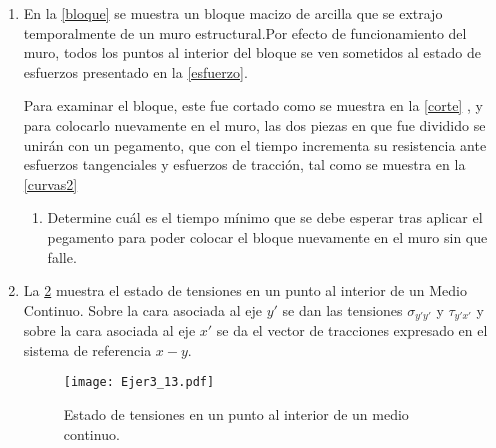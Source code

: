 \documentclass[../notas medios.tex]{subfiles}
\begin{document}
\begin{enumerate}
\item \label{punto12} En la \cref{bloque} se muestra un bloque macizo de
arcilla que se extrajo temporalmente de un muro estructural.Por efecto de funcionamiento del muro, todos los puntos al interior del bloque se ven sometidos al estado de esfuerzos presentado en la \cref{esfuerzo}.
%
\begin{figure}[H]
	\centering
		\hspace{0.5cm}
	\caption{ }
	\label{TensSupPrin}
\end{figure}
%
Para examinar el bloque, este fue cortado como se muestra en la \cref{corte} , y para colocarlo nuevamente en el muro, las dos piezas en que fue dividido se unirán con un pegamento, que con el tiempo incrementa su resistencia ante esfuerzos tangenciales y esfuerzos de tracción, tal como se muestra en la \cref{curvas2} 
%
\begin{figure}[H]
	\centering
		\hspace{1.0cm}
	\caption{ }
\end{figure}
%
\begin{enumerate}
	\item Determine cuál es el  tiempo mínimo que se debe esperar tras aplicar el pegamento para poder colocar el bloque nuevamente en el muro sin que falle.  
\end{enumerate}
%
\item \label{punto13} La \cref{esta:tensiopoint} muestra el estado de
tensiones en un punto al interior de un Medio Continuo. Sobre la cara asociada al eje $y'$ se dan las tensiones $\sigma_{y'y'}$ y $\tau_{y'x'}$ y sobre la cara asociada al eje $x'$ se da el vector de tracciones expresado en el sistema de referencia $x-y$.\\
%
\begin{figure}[H]
	\centering
	\texttt{[image: Ejer3\_13.pdf]}
	\caption{Estado de tensiones en un punto al interior de un medio continuo.}
	\label{esta:tensiopoint}
\end{figure}


\end{enumerate}
\end{document}
